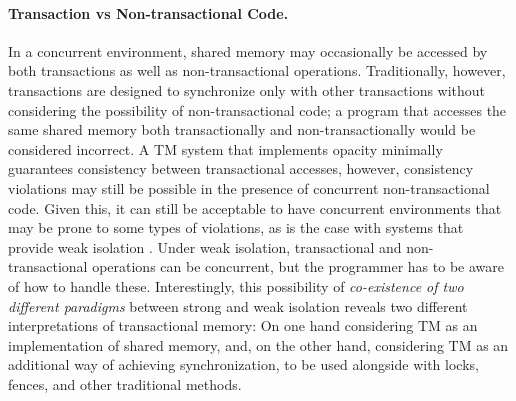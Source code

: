 
\paragraph{Transaction vs Non-transactional Code.}
In a  concurrent environment,  shared memory  may  occasionally be
accessed by both transactions as well as  
non-transactional operations. %
Traditionally, however, transactions
are designed to synchronize only with other transactions  
without considering the possibility of  non-transactional code;
a program that accesses the same shared memory both transactionally
and non-transactionally would be considered incorrect.
A TM system that implements opacity minimally guarantees consistency between transactional
accesses, however, consistency violations  may  still be  
possible  in the  presence  of concurrent  non-transactional
code.
Given this, it can still be acceptable to have concurrent environments  
that may be prone to some types  of violations, as is the case with systems
that provide weak isolation \cite{blundell06,shpeis07}.
Under weak isolation, transactional and non-transactional operations can be
concurrent, but the programmer has to be aware of how to handle these.
Interestingly, this possibility of {\it co-existence of two different paradigms}
between strong and weak isolation reveals 
two different interpretations of transactional memory: On one hand considering TM as an implementation
of shared memory, and, on the other hand, considering TM as an additional way of achieving synchronization, 
to be used alongside with locks, fences, and other traditional methods.

